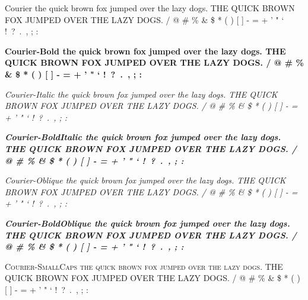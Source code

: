 \documentclass{article}
\begin{document}
\newpage
{\selectfont
Courier \newline
the quick brown fox jumped over the lazy dogs. \newline
THE QUICK BROWN FOX JUMPED OVER THE LAZY DOGS.  / @ \# \% \& \$ * ( ) [ ] - = + ' " ` !\ ?\ .\ , ; :  \par
{\bfseries
Courier-Bold \newline
the quick brown fox jumped over the lazy dogs. \newline
THE QUICK BROWN FOX JUMPED OVER THE LAZY DOGS.  / @ \# \% \& \$ * ( ) [ ] - = + ' " ` !\ ?\ .\ , ; : } \par
{\itshape
Courier-Italic \newline
the quick brown fox jumped over the lazy dogs. \newline
THE QUICK BROWN FOX JUMPED OVER THE LAZY DOGS.  / @ \# \% \& \$ * ( ) [ ] - = + ' " ` !\ ?\ .\ , ; : } \par
{\bfseries \itshape
Courier-BoldItalic \newline
the quick brown fox jumped over the lazy dogs. \newline
THE QUICK BROWN FOX JUMPED OVER THE LAZY DOGS.  / @ \# \% \& \$ * ( ) [ ] - = + ' " ` !\ ?\ .\ , ; : } \par
{\slshape
Courier-Oblique \newline
the quick brown fox jumped over the lazy dogs. \newline
THE QUICK BROWN FOX JUMPED OVER THE LAZY DOGS.  / @ \# \% \& \$ * ( ) [ ] - = + ' " ` !\ ?\ .\ , ; : } \par
{\bfseries \slshape
Courier-BoldOblique \newline
the quick brown fox jumped over the lazy dogs. \newline
THE QUICK BROWN FOX JUMPED OVER THE LAZY DOGS.  / @ \# \% \& \$ * ( ) [ ] - = + ' " ` !\ ?\ .\ , ; : } \par
{\scshape
Courier-SmallCaps \newline
the quick brown fox jumped over the lazy dogs. \newline
THE QUICK BROWN FOX JUMPED OVER THE LAZY DOGS.  / @ \# \% \& \$ * ( ) [ ] - = + ' " ` !\ ?\ .\ , ; : }} \par
\newpage
\end{document}
